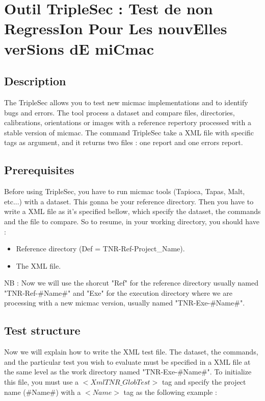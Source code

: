 \documentclass[a4paper]{book}
\begin{document}
\chapter{Outil TripleSec : Test de non RegressIon Pour Les nouvElles verSions dE miCmac}

\section{Description}
The TripleSec allows you to test new micmac implementations and to identify bugs and errors. The tool process a dataset and compare files, directories, calibrations, orientations or images with a reference repertory processed with a stable version of micmac. The command TripleSec take a XML file with specific tags as argument, and it returns two files : one report and one errors report.

\section{Prerequisites}
Before using TripleSec, you have to run micmac tools (Tapioca, Tapas, Malt, etc...) with a dataset. This gonna be your reference directory. Then you have to write a XML file as it's specified bellow, which specify the dataset, the commands and the file to compare. So to resume, in your working directory, you should have :
\begin{itemize}
\item Reference directory (Def = TNR-Ref-Project\_Name).
\item The XML file.
\end{itemize}

NB : Now we will use the shorcut "Ref" for the reference directory usually named "TNR-Ref-\#Name\#" and "Exe" for the execution directory where we are processing with a new micmac version, usually named "TNR-Exe-\#Name\#".

\section{Test structure}
Now we will explain how to write the XML test file.
The dataset, the commands, and the particular test you wish to evaluate must be specified in a XML file at the same level as the work directory named "TNR-Exe-\#Name\#".
To initialize this file, you must use a $<XmlTNR\_GlobTest>$ tag and specify the project name (\#Name\#) with a $<Name>$ tag as the following example :
\end{document}
